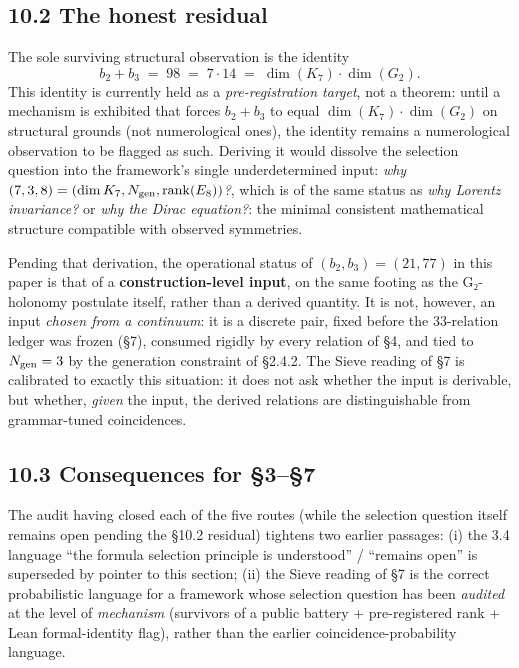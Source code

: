 \documentclass[11pt,a4paper]{article}
\begin{document}
\subsection{10.2 The honest residual}\label{the-honest-residual}

The sole surviving structural observation is the identity \[
b_2 + b_3 \;=\; 98 \;=\; 7 \cdot 14 \;=\; \dim(K_7) \cdot \dim(G_2).
\] This identity is currently held as a \emph{pre-registration target}, not a theorem: until a mechanism is exhibited that forces \(b_2 + b_3\) to equal \(\dim(K_7) \cdot \dim(G_2)\) on structural grounds (not numerological ones), the identity remains a numerological observation to be flagged as such. Deriving it would dissolve the selection question into the framework's single underdetermined input: \emph{why \((7, 3, 8) = (\dim K_7, N_{\rm gen}, \mathrm{rank}(E_8))\)?}, which is of the same status as \emph{why Lorentz invariance?} or \emph{why the Dirac equation?}: the minimal consistent mathematical structure compatible with observed symmetries.

Pending that derivation, the operational status of \((b_2, b_3) = (21, 77)\) in this paper is that of a \textbf{construction-level input}, on the same footing as the G₂-holonomy postulate itself, rather than a derived quantity. It is not, however, an input \emph{chosen from a continuum}: it is a discrete pair, fixed before the 33-relation ledger was frozen (§7), consumed rigidly by every relation of §4, and tied to \(N_{\rm gen} = 3\) by the generation constraint of §2.4.2. The Sieve reading of §7 is calibrated to exactly this situation: it does not ask whether the input is derivable, but whether, \emph{given} the input, the derived relations are distinguishable from grammar-tuned coincidences.

\subsection{10.3 Consequences for §3--§7}\label{consequences-for-37}

The audit having closed each of the five routes (while the selection question itself remains open pending the §10.2 residual) tightens two earlier passages: (i) the 3.4 language ``the formula selection principle is understood'' / ``remains open'' is superseded by pointer to this section; (ii) the Sieve reading of §7 is the correct probabilistic language for a framework whose selection question has been \emph{audited} at the level of \emph{mechanism} (survivors of a public battery + pre-registered rank + Lean formal-identity flag), rather than the earlier coincidence-probability language.
\end{document}
